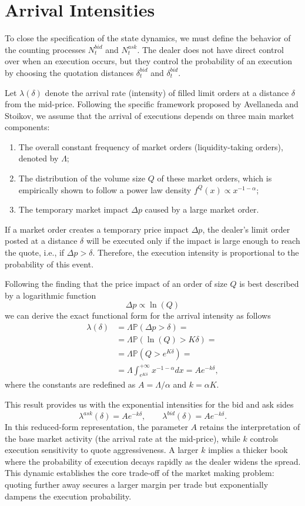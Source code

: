 \documentclass[a4paper,10pt,titlepage,oneside,openany]{book}
\theoremstyle{plain}\newtheorem{theorem}{Theorem}[chapter]
\theoremstyle{definition}\newtheorem{definition}{Definition}[chapter]
\theoremstyle{remark}\newtheorem{remark}{Remark}[chapter]
\begin{document}
\section{Arrival Intensities}
To close the specification of the state dynamics, we must define the behavior of the counting processes $N_t^{bid}$ and $N_t^{ask}$. The dealer does not have direct control over when an execution occurs, but they control the probability of an execution by choosing the quotation distances $\delta_t^{bid}$ and $\delta_t^{bid}$.

Let $\lambda(\delta)$ denote the arrival rate (intensity) of filled limit orders at a distance $\delta$ from the mid-price. Following the specific framework proposed by Avellaneda and Stoikov, we assume that the arrival of executions depends on three main market components:
\begin{enumerate}
    \item The overall constant frequency of market orders (liquidity-taking orders), denoted by $\Lambda$;
    \item The distribution of the volume size $Q$ of these market orders, which is empirically shown to follow a power law density $f^Q(x) \propto x^{-1-\alpha}$;
    \item The temporary market impact $\Delta p$ caused by a large market order.
\end{enumerate}
If a market order creates a temporary price impact $\Delta p$, the dealer's limit order posted at a distance $\delta$ will be executed only if the impact is large enough to reach the quote, i.e., if $\Delta p>\delta$. Therefore, the execution intensity is proportional to the probability of this event.

Following the finding that the price impact of an order of size $Q$ is best described by a logarithmic function 
\[
\Delta p \propto \ln{(Q)} 
\]
we can derive the exact functional form for the arrival intensity as follows
\begin{align*}
    \lambda(\delta)&=\Lambda \mathbb{P}(\Delta p>\delta)=\\
    &=\Lambda \mathbb{P}(\ln{(Q)}>K\delta)=\\
    &=\Lambda \mathbb{P}(Q>e^{K\delta})=\\
    &=\Lambda \int_{e^{K\delta}}^{+\infty}x^{-1-\alpha}dx= Ae^{-k\delta},
\end{align*}
where the constants are redefined as $A = \Lambda /\alpha$ and $k=\alpha K$.

This result provides us with the exponential intensities for the bid and ask sides
\[
\lambda^{ask}(\delta)=Ae^{-k\delta}, \qquad \lambda^{bid}(\delta)=Ae^{-k\delta}.
\]
In this reduced-form representation, the parameter $A$ retains the interpretation of the base market activity (the arrival rate at the mid-price), while $k$ controls execution sensitivity to quote aggressiveness. A larger $k$ implies a thicker book where the probability of execution decays rapidly as the dealer widens the spread. This dynamic establishes the core trade-off of the market making problem: quoting further away secures a larger margin per trade but exponentially dampens the execution probability.
\end{document}
